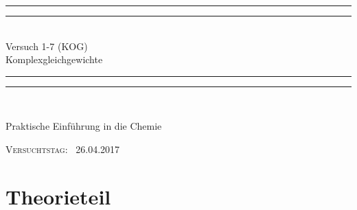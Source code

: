\documentclass{scrartcl}
\newlength{\drop}
\begin{document}
  \begin{titlepage}
    \textheight
    \centering
    \vspace*{\baselineskip}
    \rule{\textwidth}{1.6pt}\vspace*{-\baselineskip}\vspace*{2pt}
    \rule{\textwidth}{0.4pt}\\[\baselineskip]
    {\LARGE Versuch 1-7 (KOG)\\[0.3\baselineskip] Komplexgleichgewichte}\\[0.2\baselineskip]
    \rule{\textwidth}{0.4pt}\vspace*{-\baselineskip}\vspace{3.2pt}
    \rule{\textwidth}{1.6pt}\\[\baselineskip]
    \scshape
    {Praktische Einführung in die Chemie\par}
    \vspace*{2\baselineskip}
    \vfill
    {\scshape Versuchtstag:} \        {\large 26.04.2017}\par
  \end{titlepage}
\section{Theorieteil}
\end{document}
